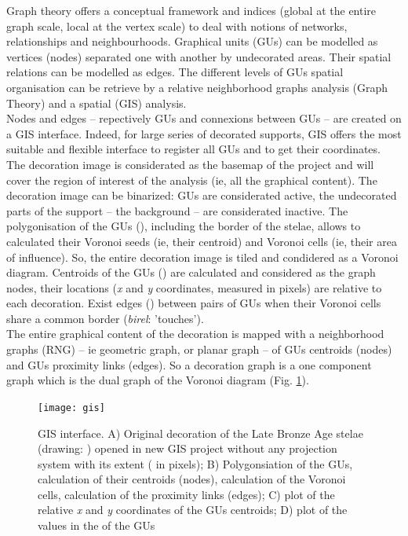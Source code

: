 \documentclass[article]{jss}\usepackage{knitr}
\begin{document}
Graph theory offers a conceptual framework and indices (global at the entire graph scale, local at the vertex scale) to deal with notions of networks, relationships and neighbourhoods. Graphical units (GUs) can be modelled as vertices (nodes) separated one with another by undecorated areas. Their spatial relations can be modelled as edges. The different levels of GUs spatial organisation can be retrieve by a relative neighborhood graphs analysis (Graph Theory) and a spatial (GIS) analysis.\\
Nodes and edges -- repectively GUs and connexions between GUs -- are created on a GIS interface. Indeed, for large series of decorated supports, GIS offers the most suitable and flexible interface to register all GUs and to get their coordinates. The decoration image is considerated as the basemap of the project and will cover the region of interest of the analysis (ie, all the graphical content). The decoration image can be binarized: GUs are considerated active, the undecorated parts of the support -- the background -- are considerated inactive. The polygonisation of the GUs (), including the border of the stelae, allows to calculated their Voronoi seeds (ie, their centroid) and Voronoi cells (ie, their area of influence). So, the entire decoration image is tiled and condidered as a Voronoi diagram. Centroids of the GUs () are calculated and considered as the graph nodes, their locations (\emph{x} and \emph{y} coordinates, measured in pixels) are relative to each decoration. Exist edges () between pairs of GUs when their Voronoi cells share a common border (\emph{birel}: 'touches').\\
The entire graphical content of the decoration is mapped with a neighborhood graphs (RNG) -- ie geometric graph, or planar graph -- of GUs centroids (nodes) and GUs proximity links (edges). So a decoration graph is a one component graph which is the dual graph of the Voronoi diagram (Fig. \ref{fig:gis}).

\begin{figure}[H]
\centering
\texttt{[image: gis]}
\caption{\label{fig:gis} GIS interface. A) Original decoration of the Late Bronze Age  stelae (drawing: \cite{DiazGuardamino10}) opened in new GIS project without any projection system with its extent ( in pixels); B) Polygonsiation of the GUs, calculation of their centroids (nodes), calculation of the Voronoi cells, calculation of the proximity links (edges); C) plot of the relative \emph{x} and \emph{y} coordinates of the GUs centroids; D) plot of the values in the  of the GUs}
\end{figure}
\end{document}
